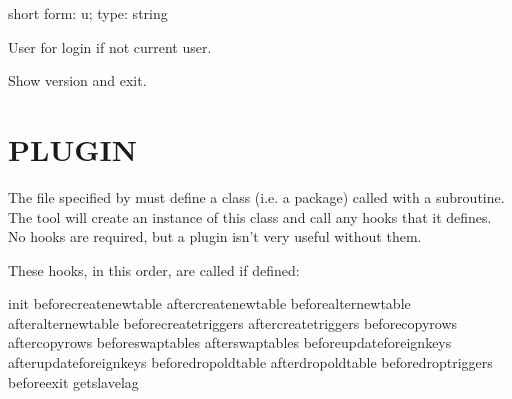 \documentclass[letterpaper,10pt,english]{sphinxmanual}
\begin{document}
\begin{fulllineitems}
\label{\detokenize{mariadb-schema-change:cmdoption-mariadb-schema-change-user}}
short form: \sphinxhyphen{}u; type: string

User for login if not current user.

\end{fulllineitems}


\begin{fulllineitems}
\label{\detokenize{mariadb-schema-change:cmdoption-mariadb-schema-change-version}}
Show version and exit.

\end{fulllineitems}



\section{PLUGIN}
\label{\detokenize{mariadb-schema-change:plugin}}
The file specified by {\hyperref[\detokenize{mariadb-schema-change:cmdoption-mariadb-schema-change-plugin}]{}} must define a class (i.e. a package)
called  with a  subroutine.
The tool will create an instance of this class and call any hooks that
it defines.  No hooks are required, but a plugin isn’t very useful without
them.

These hooks, in this order, are called if defined:

\begin{sphinxVerbatim}[commandchars=\\\{\}]
init
before\PYGZus{}create\PYGZus{}new\PYGZus{}table
after\PYGZus{}create\PYGZus{}new\PYGZus{}table
before\PYGZus{}alter\PYGZus{}new\PYGZus{}table
after\PYGZus{}alter\PYGZus{}new\PYGZus{}table
before\PYGZus{}create\PYGZus{}triggers
after\PYGZus{}create\PYGZus{}triggers
before\PYGZus{}copy\PYGZus{}rows
after\PYGZus{}copy\PYGZus{}rows
before\PYGZus{}swap\PYGZus{}tables
after\PYGZus{}swap\PYGZus{}tables
before\PYGZus{}update\PYGZus{}foreign\PYGZus{}keys
after\PYGZus{}update\PYGZus{}foreign\PYGZus{}keys
before\PYGZus{}drop\PYGZus{}old\PYGZus{}table
after\PYGZus{}drop\PYGZus{}old\PYGZus{}table
before\PYGZus{}drop\PYGZus{}triggers
before\PYGZus{}exit
get\PYGZus{}slave\PYGZus{}lag
\end{sphinxVerbatim}
\end{document}
